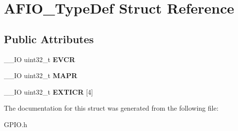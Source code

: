 \hypertarget{struct_a_f_i_o___type_def}{}\section{A\+F\+I\+O\+\_\+\+Type\+Def Struct Reference}
\label{struct_a_f_i_o___type_def}
\subsection*{Public Attributes}
\begin{DoxyCompactItemize}
\item 
\mbox{\label{struct_a_f_i_o___type_def_a377d5227cd20950e4489cd04df16500f}} 
\+\_\+\+\_\+\+IO uint32\+\_\+t {\bfseries E\+V\+CR}
\item 
\mbox{\label{struct_a_f_i_o___type_def_a2b44ba1a427df7d8c0b254f869b9b463}} 
\+\_\+\+\_\+\+IO uint32\+\_\+t {\bfseries M\+A\+PR}
\item 
\mbox{\label{struct_a_f_i_o___type_def_a5f590aa12271be60c2f61b0a6d2b8772}} 
\+\_\+\+\_\+\+IO uint32\+\_\+t {\bfseries E\+X\+T\+I\+CR} \mbox{[}4\mbox{]}
\end{DoxyCompactItemize}


The documentation for this struct was generated from the following file\+:\begin{DoxyCompactItemize}
\item 
G\+P\+I\+O.\+h\end{DoxyCompactItemize}
